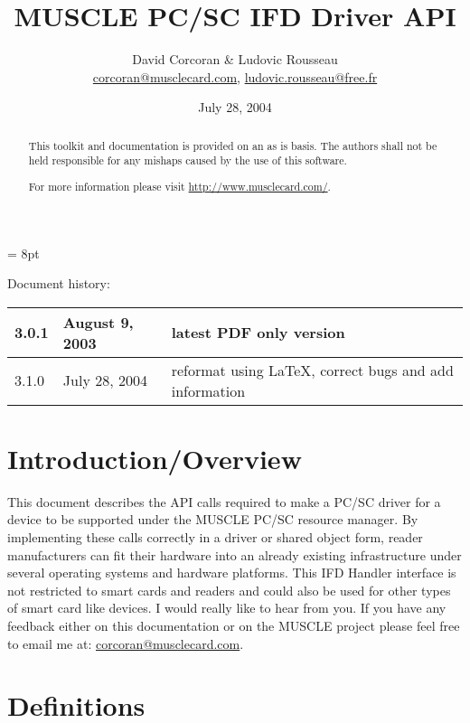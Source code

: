 \documentclass[a4paper,12pt]{article}
\title{MUSCLE PC/SC IFD Driver API}
\author{David Corcoran \& Ludovic Rousseau\\
\url{corcoran@musclecard.com}, \url{ludovic.rousseau@free.fr}}
\date{July 28, 2004}
\begin{document}
\maketitle

\begin{abstract}
This toolkit and documentation is provided on an as is basis. The
authors shall not be held responsible for any mishaps caused by the use
of this software.

For more information please visit \url{http://www.musclecard.com/}.

\end{abstract}

\parskip = 8pt

\addtolength{\parindent}{-\parindent}

Document history: \\
\begin{tabular}{|l|l|l|}
\hline
3.0.1 & August 9, 2003 & latest PDF only version \\
\hline
3.1.0 & July 28, 2004 & reformat using \LaTeX{}, correct bugs and add
information \\
\hline
\end{tabular}

\newpage
\tableofcontents
\newpage

\section{Introduction/Overview}

This document describes the API calls required to make a PC/SC driver
for a device to be supported under the MUSCLE PC/SC resource manager. By
implementing these calls correctly in a driver or shared object form,
reader manufacturers can fit their hardware into an already existing
infrastructure under several operating systems and hardware platforms.
This IFD Handler interface is not restricted to smart cards and readers
and could also be used for other types of smart card like devices. I
would really like to hear from you. If you have any feedback either on
this documentation or on the MUSCLE project please feel free to email me
at: \url{corcoran@musclecard.com}.



\section{Definitions}
\end{document}
